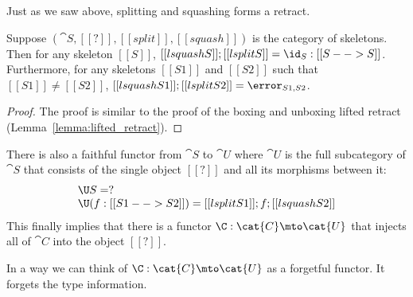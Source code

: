 Just as we saw above, splitting and squashing forms a retract.
\begin{lemma}
  \label{lemma:lifted_retract_for_?}
  Suppose $(\cat{S}, [[?]], [[split]],[[squash]])$ is the category of
  skeletons.  Then for any skeleton $[[S]]$, $[[lsquash S]];[[lsplit S]] = \id_S : [[S --> S]]$.
  Furthermore, for
  any skeletons $[[S1]]$ and $[[S2]]$ such that $[[S1]] \neq [[S2]]$,
  $[[lsquash S1]];[[lsplit S2]] = \error_{S1,S2}$.
\end{lemma}
\begin{proof}
  The proof is similar to the proof of the boxing and unboxing lifted
  retract (Lemma~\ref{lemma:lifted_retract}).
\end{proof}
\noindent
There is also a faithful functor from $\cat{S}$ to $\cat{U}$ where
$\cat{U}$ is the full subcategory of $\cat{S}$ that consists of the
single object $[[?]]$ and all its morphisms between it:
\[
\begin{array}{lll}
  \U S = ?\\
  \U (f : [[S1 --> S2]]) = [[lsplit S1]];f;[[lsquash S2]]
\end{array}
\]
This finally implies that there is a functor $\C : \cat{C} \mto
\cat{U}$ that injects all of $\cat{C}$ into the object $[[?]]$.
\noindent
In a way we can think of $\C :  \mto {}$ as a forgetful
functor.  It forgets the type information.

